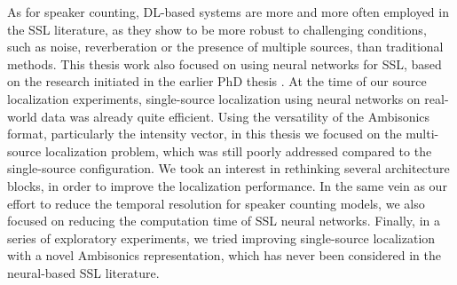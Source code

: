 As for speaker counting, DL-based systems are more and more often employed in the SSL literature, as they show to be more robust to challenging conditions, such as noise, reverberation or the presence of multiple sources, than traditional methods. This thesis work also focused on using neural networks for SSL, based on the research initiated in the earlier PhD thesis \cite{perotin_localisation_2019}. At the time of our source localization experiments, single-source localization using neural networks on real-world data was already quite efficient. Using the versatility of the Ambisonics format, particularly the intensity vector, in this thesis we focused on the multi-source localization problem, which was still poorly addressed compared to the single-source configuration. We took an interest in rethinking several architecture blocks, in order to improve the localization performance. In the same vein as our effort to reduce the temporal resolution for speaker counting models, we also focused on reducing the computation time of SSL neural networks. Finally, in a series of exploratory experiments, we tried improving single-source localization with a novel Ambisonics representation, which has never been considered in the neural-based SSL literature.
